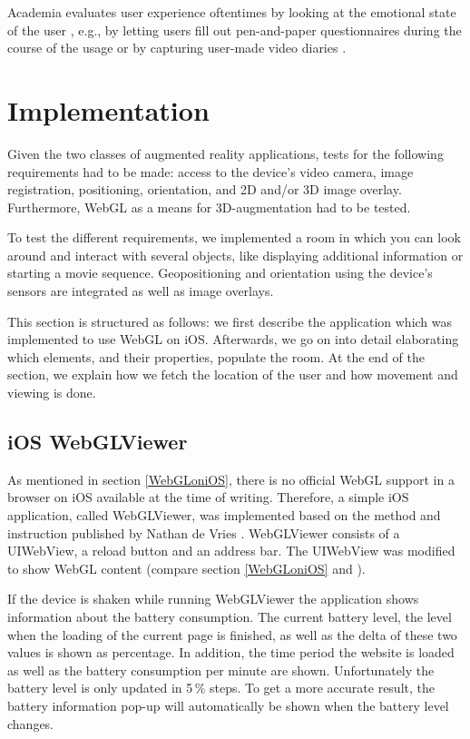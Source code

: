 \documentclass[12pt,journal,compsoc]{IEEEtran}
\begin{document}
Academia evaluates user experience oftentimes by looking at the emotional state of the user \cite{Roto2006}, e.g., by letting users fill out pen-and-paper questionnaires during the course of the usage or by capturing user-made video diaries \cite{Csikszentmihalyi1987, Isomursu2004}.




\section{Implementation}
Given the two classes of augmented reality applications, tests for the following requirements had to be made: access to the device’s video camera, image registration, positioning, orientation, and 2D and/or 3D image overlay. Furthermore, WebGL as a means for 3D-augmentation had to be tested.

To test the different requirements, we implemented a room in which you can look around and interact with several objects, like displaying additional information or starting a movie sequence. Geopositioning and orientation using the device’s sensors are integrated as well as image overlays.

This section is structured as follows: we first describe the application which was implemented to use WebGL on iOS. Afterwards, we go on into detail elaborating which elements, and their properties, populate the room. At the end of the section, we explain how we fetch the location of the user and how movement and viewing is done.


\subsection{iOS WebGLViewer} \label{WebGLViewer}
As mentioned in section \ref{WebGLoniOS}, there is no official WebGL support in a browser on iOS available at the time of writing. Therefore, a simple iOS application, called WebGLViewer, was implemented based on the method and instruction published by Nathan de Vries \cite{deVries2011}. WebGLViewer consists of a UIWebView, a reload button and an address bar. The UIWebView was modified to show WebGL content (compare section \ref{WebGLoniOS} and \cite{deVries2011}). 
	
If the device is shaken while running WebGLViewer the application shows information about the battery consumption. The current battery level, the level when the loading of the current page is finished, as well as the delta of these two values is shown as percentage. In addition, the time period the website is loaded as well as the battery consumption per minute are shown. Unfortunately the battery level is only updated in 5\,\% steps. To get a more accurate result, the battery information pop-up will automatically be shown when the battery level changes.
	
\end{document}
